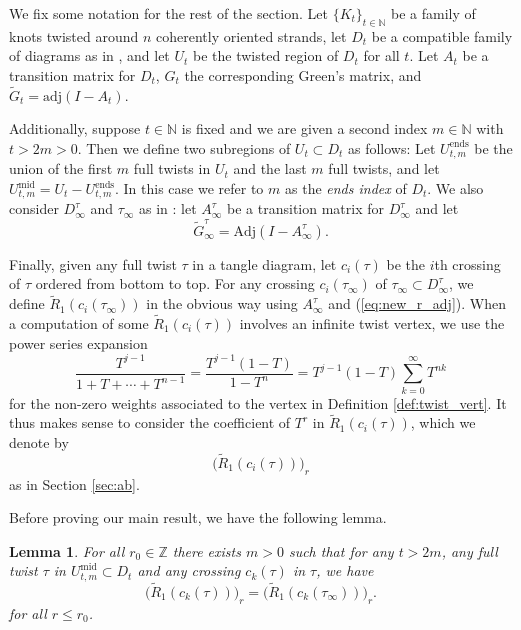 \documentclass[11pt,hyp,]{nyjm}
\newcommand{\Z}{\mathbb{Z}}
\newcommand{\N}{\mathbb{N}}
\numberwithin{thm}{section}
\newtheorem{lemma}[thm]{Lemma}
\theoremstyle{definition}
\theoremstyle{remark}
\begin{document}
	We fix some notation for the rest of the section. Let $\{K_t\}_{t \in \N}$ be a family of knots twisted around $n$ coherently oriented strands, let $D_t$ be a compatible family of diagrams as in , and let $U_t$ be the twisted region of $D_t$ for all $t$. Let $A_t$ be a transition matrix for $D_t$, $G_t$ the corresponding Green's matrix, and $\widetilde{G}_t = \text{adj}(I - A_t)$.
	
	Additionally, suppose $t \in \N$ is fixed and we are given a second index $m \in \N$ with $t > 2m > 0$. Then we define two subregions of $U_t \subset D_t$ as follows: Let $U_{t,m}^\text{ends}$ be the union of the first $m$ full twists in $U_t$ and the last $m$ full twists, and let $U_{t,m}^\text{mid} = U_t - U_{t,m}^{\text{ends}}$. In this case we refer to $m$ as the {\em ends index} of $D_t$. We also consider $D^\tau_\infty$ and $\tau_\infty$ as in : let $A_\infty^\tau$ be a transition matrix for $D_\infty^\tau$ and let
	$$
	\widetilde{G}_\infty^\tau =  \text{Adj}(I - A_\infty^\tau).
	$$
	
	Finally, given any full twist $\tau$ in a tangle diagram, let $c_i(\tau)$ be the $i$th crossing of $\tau$ ordered from bottom to top. For any crossing $c_i(\tau_\infty)$ of $\tau_\infty \subset D^\tau_\infty$, we define $\tilde{R}_1(c_i(\tau_\infty))$ in the obvious way using $A^\tau_\infty$ and (\ref{eq:new_r_adj}). When a computation of some $\widetilde{R}_1(c_i(\tau))$ involves an infinite twist vertex, we use the power series expansion
	\begin{equation}
		\label{eq:pow}
		\frac{T^{j - 1}}{1 + T + \cdots + T^{n - 1}} = \frac{T^{j - 1}(1 - T)}{1 - T^n} = T^{j - 1}(1 - T)\sum_{k = 0}^\infty T^{nk}
	\end{equation}
	for the non-zero weights associated to the vertex in Definition \ref{def:twist_vert}. It thus makes sense to consider the coefficient of $T^r$ in $\tilde{R}_1(c_i(\tau))$, which we denote by
	$$
	\big(\tilde{R}_1(c_i(\tau))\big)_r
	$$
	as in Section \ref{sec:ab}.
	
	Before proving our main result, we have the following lemma.
	\begin{lemma}
		\label{lem:tech}
		For all $r_0 \in \Z$ there exists $m > 0$ such that for any $t > 2m$, any full twist $\tau$ in $U_{t,m}^\text{mid} \subset D_t$ and any crossing $c_k(\tau)$ in $\tau$, we have
		$$
		\big(\widetilde{R}_1(c_k(\tau))\big)_r = \big(\widetilde{R}_1(c_k(\tau_\infty))\big)_r.
		$$
		for all $r \leq r_0$.
	\end{lemma}
\end{document}
